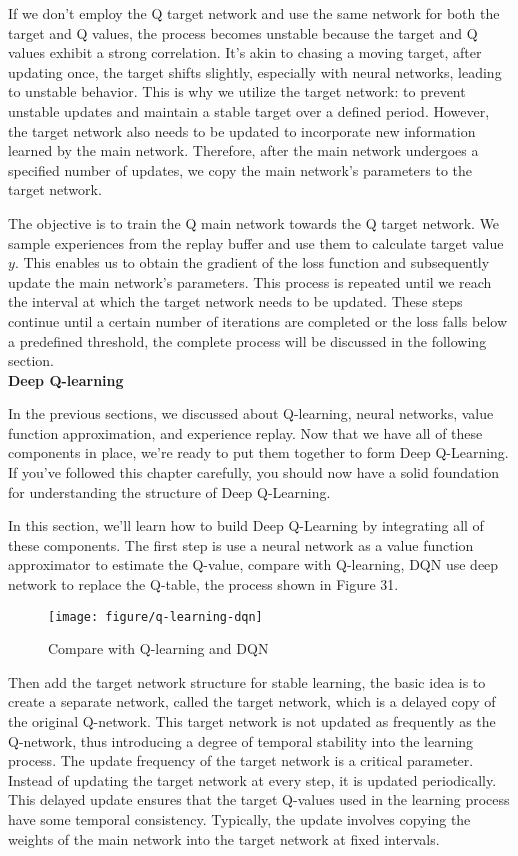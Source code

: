 \documentclass{article}
\begin{document}
If we don't employ the Q target network and use the same network for both the target and Q values, the process becomes unstable because the target and Q values exhibit a strong correlation. It's akin to chasing a moving target, after updating once, the target shifts slightly, especially with neural networks, leading to unstable behavior. This is why we utilize the target network: to prevent unstable updates and maintain a stable target over a defined period. However, the target network also needs to be updated to incorporate new information learned by the main network. Therefore, after the main network undergoes a specified number of updates, we copy the main network's parameters to the target network.

The objective is to train the Q main network towards the Q target network. We sample experiences from the replay buffer and use them to calculate target value $y$. This enables us to obtain the gradient of the loss function and subsequently update the main network's parameters. This process is repeated until we reach the interval at which the target network needs to be updated. These steps continue until a certain number of iterations are completed or the loss falls below a predefined threshold, the complete process will be discussed in the following section.\\


\noindent
\textbf{Deep Q-learning}\\
\noindent

In the previous sections, we discussed about Q-learning, neural networks, value function approximation, and experience replay. Now that we have all of these components in place, we're ready to put them together to form Deep Q-Learning. If you've followed this chapter carefully, you should now have a solid foundation for understanding the structure of Deep Q-Learning.

In this section, we'll learn how to build Deep Q-Learning by integrating all of these components. The first step is use a neural network as a value function approximator to estimate the Q-value, compare with Q-learning, DQN use deep network to replace the Q-table, the process shown in Figure 31.

\begin{figure}[htbp]
        \centering
        \texttt{[image: figure/q-learning-dqn]}
        \caption{Compare with Q-learning and DQN}
\end{figure}

Then add the target network structure for stable learning, the basic idea is to create a separate network, called the target network, which is a delayed copy of the original Q-network. This target network is not updated as frequently as the Q-network, thus introducing a degree of temporal stability into the learning process. The update frequency of the target network is a critical parameter. Instead of updating the target network at every step, it is updated periodically. This delayed update ensures that the target Q-values used in the learning process have some temporal consistency. Typically, the update involves copying the weights of the main network into the target network at fixed intervals.
\end{document}
